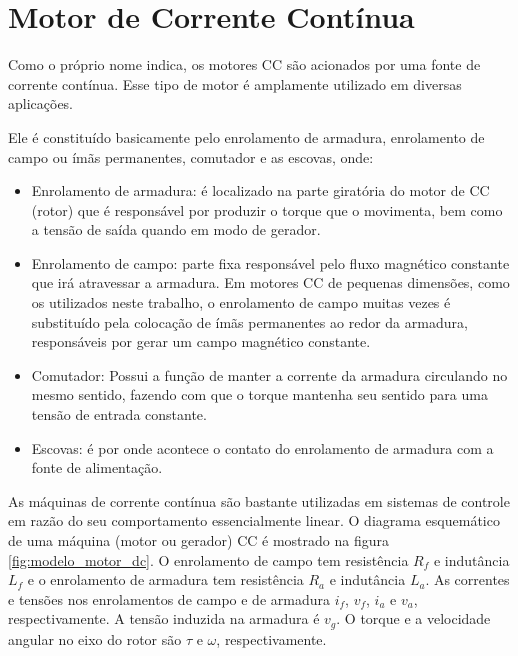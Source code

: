 \section{Motor de Corrente Contínua}
\label{sec:motor_ref_teo}
Como o próprio nome indica, os motores CC são acionados por uma fonte de corrente contínua. Esse tipo de motor é amplamente utilizado em diversas aplicações.

Ele é constituído basicamente pelo enrolamento de armadura, enrolamento de campo ou ímãs permanentes, comutador e as escovas, onde:

\begin{itemize}
    \item Enrolamento de armadura: é localizado na parte giratória do motor de CC (rotor) que é responsável por produzir o torque que o movimenta, bem como a tensão de saída quando em modo de gerador.
    
    \item Enrolamento de campo: parte fixa responsável pelo fluxo magnético constante que irá atravessar a armadura. Em motores CC de pequenas dimensões, como os utilizados neste trabalho, o enrolamento de campo muitas vezes é substituído pela colocação de ímãs permanentes ao redor da armadura, responsáveis por gerar um campo magnético constante.
    
    \item Comutador: Possui a função de manter a corrente da armadura circulando no mesmo sentido, fazendo com que o torque mantenha seu sentido para uma tensão de entrada constante.
    
    \item Escovas: é por onde acontece o contato do enrolamento de armadura com a fonte de alimentação.
\end{itemize}


As máquinas de corrente contínua são bastante utilizadas em sistemas de controle em razão do seu comportamento essencialmente linear. O diagrama esquemático de uma máquina (motor ou gerador) CC é mostrado na figura \ref{fig:modelo_motor_dc}. O enrolamento de campo tem resistência $R_f$ e indutância $L_f$ e o enrolamento de armadura tem resistência $R_a$ e indutância $L_a$. As correntes e tensões nos enrolamentos de campo e de armadura $i_f$, $v_f$, $i_a$ e $v_a$, respectivamente. A tensão induzida na armadura é $v_g$. O torque e a velocidade angular no eixo do rotor são $\tau$ e $\omega$, respectivamente.

